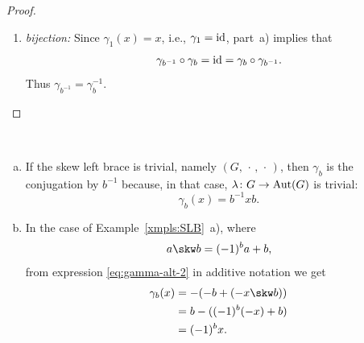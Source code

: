 \begin{proof}
\begin{enumerate}[a),font=\upshape]
\begin{enumerate}[-]
                \item \textit{bijection:}
                    Since $\gamma_1(x) = x$, i.e., $\gamma_1=\operatorname{id}$, part~a) implies that
                    $$
                        \gamma_{b^{-1}}\circ\gamma_b=\operatorname{id}
                            =\gamma_b\circ\gamma_{b^{-1}}.
                    $$
                    Thus $\gamma_{b^{-1}}=\gamma_b^{-1}$.
        \end{enumerate}
    \end{enumerate}
\end{proof}

\begin{xmpls}${}$
    \begin{enumerate}[a),font=\upshape]
        \item If the skew left brace is trivial, namely $(G,\,\cdot\,,\,\cdot\,)$, then $\gamma_b$ is the conjugation by $b^{-1}$ because, in that case, $\lambda\colon G\to{\rm Aut}(G)$ is trivial:
        $$
            \gamma_b(x) = b^{-1}xb.
        $$

        \item In the case of Example~\ref{xmpls:SLB}~a), where
        $$
            a\skw b = (-1)^ba + b,
        $$
        from expression \eqref{eq:gamma-alt-2} in additive notation we get
        \begin{align*}
            \gamma_b(x) &= -(-b+(-x\skw b))\\
                &= b-((-1)^b(-x)+b)\\
                &= (-1)^bx.
        \end{align*}


\end{enumerate}
\end{xmpls}
